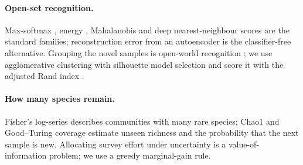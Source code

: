 \paragraph{Open-set recognition.} Max-softmax \cite{hendrycks2017baseline},
energy \cite{liu2020energy}, Mahalanobis \cite{lee2018simple} and deep
nearest-neighbour \cite{sun2022knn} scores are the standard families;
reconstruction error from an autoencoder is the classifier-free alternative.
Grouping the novel samples is open-world recognition \cite{bendale2015towards};
we use agglomerative clustering with silhouette model selection and score it
with the adjusted Rand index \cite{hubert1985comparing}.

\paragraph{How many species remain.} Fisher's log-series
\cite{fisher1943relation} describes communities with many rare species; Chao1
\cite{chao1984nonparametric} and Good--Turing coverage
\cite{good1953population} estimate unseen richness and the probability that
the next sample is new. Allocating survey effort under uncertainty is a
value-of-information problem; we use a greedy marginal-gain rule.

